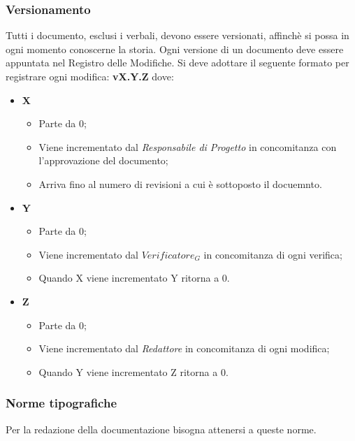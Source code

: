 	\subsubsection{Versionamento}
	Tutti i documento, esclusi i verbali, devono essere versionati, affinchè si possa in ogni momento conoscerne la storia. Ogni versione di un documento deve essere appuntata nel Registro delle Modifiche. Si deve adottare il seguente formato per registrare ogni modifica: 
	\textbf{v{X}.{Y}.{Z}}
	dove:
	\begin{itemize}
		\item \textbf{X}
		\begin{itemize}
			\item Parte da 0;
			\item Viene incrementato dal \textit{Responsabile di Progetto} in concomitanza con l'approvazione del documento;
			\item Arriva fino al numero di revisioni a cui è sottoposto il docuemnto.
		\end{itemize}
		
		\item \textbf{Y}
		\begin{itemize}
			\item Parte da 0;
			\item Viene incrementato dal \textit{$Verificatore_G$} in concomitanza di ogni verifica;
			\item Quando X viene incrementato Y ritorna a 0.
		\end{itemize}
		
		\item \textbf{Z}
		\begin{itemize}
			\item Parte da 0;
			\item Viene incrementato dal \textit{Redattore} in concomitanza di ogni modifica;
			\item Quando Y viene incrementato Z	 ritorna a 0.
		\end{itemize}
		
	\end{itemize}
	
	\subsubsection{Norme tipografiche} Per la redazione della documentazione bisogna attenersi a queste norme.
		
